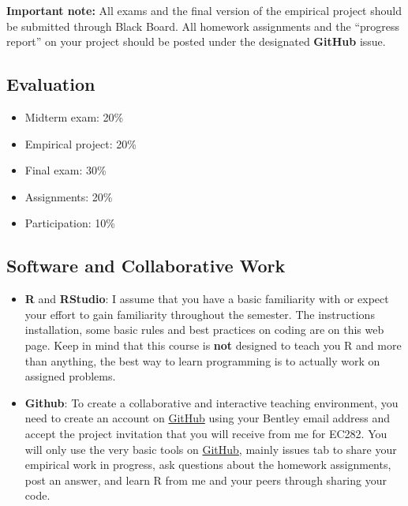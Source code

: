 \documentclass[
]{book}
\providecommand{\tightlist}{%
  \setlength{\itemsep}{0pt}\setlength{\parskip}{0pt}}
\begin{document}
\textbf{Important note:} All exams and the final version of the empirical project should be submitted through Black Board. All homework assignments and the ``progress report'' on your project should be posted under the designated \textbf{GitHub} issue.

\hypertarget{evaluation}{%
\subsection*{Evaluation}\label{evaluation}}

\begin{itemize}
\tightlist
\item
  Midterm exam: 20\%
\item
  Empirical project: 20\%
\item
  Final exam: 30\%
\item
  Assignments: 20\%
\item
  Participation: 10\%
\end{itemize}

\hypertarget{software-and-collaborative-work}{%
\subsection*{Software and Collaborative Work}\label{software-and-collaborative-work}}

\begin{itemize}
\item
  \textbf{R} and \textbf{RStudio}: I assume that you have a basic familiarity with or expect your effort to gain familiarity throughout the semester. The instructions installation, some basic rules and best practices on coding are on this web page. Keep in mind that this course is \textbf{not} designed to teach you R and more than anything, the best way to learn programming is to actually work on assigned problems.
\item
  \textbf{Github}: To create a collaborative and interactive teaching environment, you need to create an account on \href{https://github.com/}{GitHub} using your Bentley email address and accept the project invitation that you will receive from me for EC282. You will only use the very basic tools on \href{https://github.com/}{GitHub}, mainly issues tab to share your empirical work in progress, ask questions about the homework assignments, post an answer, and learn R from me and your peers through sharing your code.
\end{itemize}
\end{document}
